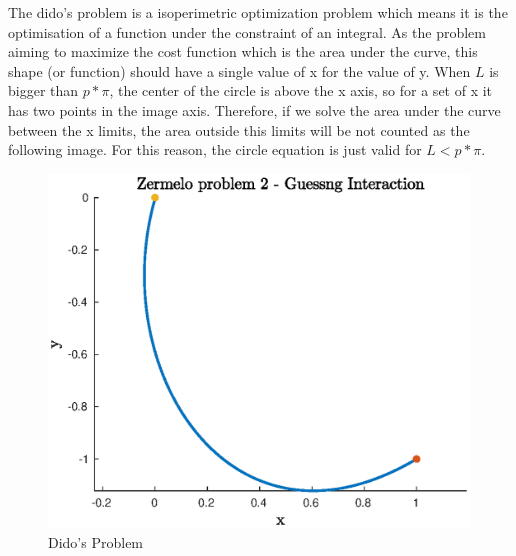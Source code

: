 \documentclass{article}
\begin{document}
The dido's problem is a isoperimetric optimization problem which means it is the optimisation of a function under the constraint of an integral. As the problem aiming to maximize the cost function which is the area under the curve, this shape (or function) should have a single value of x for the value of y. When $L$ is bigger than $p*\pi$, the center of the circle is above the x axis, so for a set of x it has two points in the image axis. Therefore, if we solve the area under the curve between the x limits, the area outside this limits will be not counted as the following image. For this reason, the circle equation is just valid for $L < p*\pi$.

\begin{figure}[H]
\centering
\includegraphics [width=4.4in]{f3}
\caption{Dido's Problem}
\end{figure}
\end{document}
